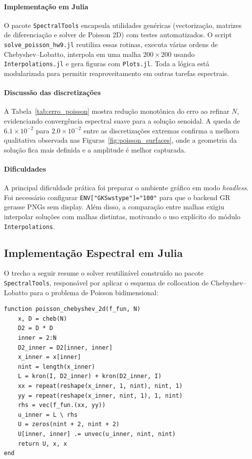 \paragraph{Implementação em Julia} O pacote \texttt{SpectralTools} encapsula utilidades genéricas (vectorização, matrizes de diferenciação e solver de Poisson 2D) com testes automatizados. O script \texttt{solve\_poisson\_hw9.jl} reutiliza essas rotinas, executa várias ordens de Chebyshev--Lobatto, interpola em uma malha $200\times200$ usando \texttt{Interpolations.jl} e gera figuras com \texttt{Plots.jl}. Toda a lógica está modularizada para permitir reaproveitamento em outras tarefas espectrais.

\paragraph{Discussão das discretizações} A Tabela~\ref{tab:erro_poisson} mostra redução monotônica do erro ao refinar $N$, evidenciando convergência espectral suave para a solução senoidal. A queda de $6.1\times10^{-2}$ para $2.0\times10^{-2}$ entre as discretizações extremas confirma a melhora qualitativa observada nas Figuras~\ref{fig:poisson_surfaces}, onde a geometria da solução fica mais definida e a amplitude é melhor capturada.

\paragraph{Dificuldades} A principal dificuldade prática foi preparar o ambiente gráfico em modo \emph{headless}. Foi necessário configurar \texttt{ENV["GKSwstype"]="100"} para que o backend GR gerasse PNGs sem display. Além disso, a comparação entre malhas exigiu interpolar soluções com malhas distintas, motivando o uso explícito do módulo \texttt{Interpolations}.

\subsection{Implementação Espectral em Julia}

O trecho a seguir resume o solver reutilizável construído no pacote \texttt{SpectralTools}, responsável por aplicar o esquema de collocation de Chebyshev--Lobatto para o problema de Poisson bidimensional:

\begin{verbatim}
function poisson_chebyshev_2d(f_fun, N)
    x, D = cheb(N)
    D2 = D * D
    inner = 2:N
    D2_inner = D2[inner, inner]
    x_inner = x[inner]
    nint = length(x_inner)
    L = kron(I, D2_inner) + kron(D2_inner, I)
    xx = repeat(reshape(x_inner, 1, nint), nint, 1)
    yy = repeat(reshape(x_inner, nint, 1), 1, nint)
    rhs = vec(f_fun.(xx, yy))
    u_inner = L \ rhs
    U = zeros(nint + 2, nint + 2)
    U[inner, inner] .= unvec(u_inner, nint, nint)
    return U, x, x
end
\end{verbatim}

